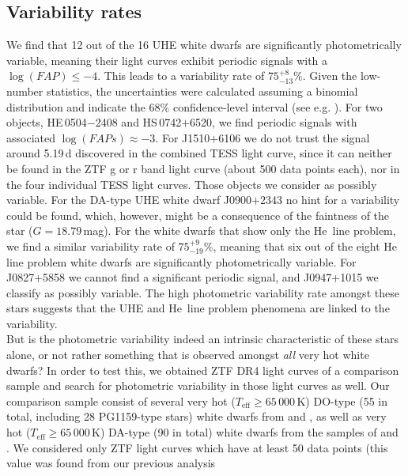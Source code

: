 \documentclass{aa}
\newcounter{Rco}
\newcommand{\Ionst}[1]{\setcounter{Rco}{#1}\Roman{Rco}}
\newcommand{\Ion}[2]{\mbox{#1\,{\scriptsize\Ionst{#2}}}}
\newcommand{\Teff}{\mbox{$T_\mathrm{eff}$}\xspace}
\begin{document}
\subsection{Variability rates}
\label{sect:var}
We find that 12 out of the 16 UHE white dwarfs are significantly
photometrically variable, meaning their light curves exhibit periodic signals
with a $\log(FAP)\leq-4$. This leads to a variability rate of $75^{+8}_{-13}$\%.
Given the low-number statistics, the uncertainties were calculated assuming
a binomial distribution and indicate the 68\% confidence-level interval
(see e.g. \citealt{Burgasser+2003}). For two objects, HE\,0504$-$2408 and
HS\,0742$+$6520, we find periodic signals with associated
$\log(FAPs)\approx -3$. For J1510$+$6106 we do not trust the signal
around 5.19\,d discovered in the combined TESS light curve, since
it can neither be found in the ZTF g or r band light curve (about 500 data
points each), nor in the four individual TESS light curves.
Those objects we consider as possibly variable.
For the DA-type UHE white dwarf J0900$+$2343 no hint for a variability
could be found, which, however, might be a consequence of the faintness of the star
($G=18.79$\,mag).
For the white dwarfs that show only the \Ion{He}{2} line problem, we find
a similar variability rate of $75^{+9}_{-19}$\%, meaning that six out of the eight
\Ion{He}{2} line problem white dwarfs are significantly photometrically
variable. For J0827+5858 we cannot find a significant periodic signal, and
J0947+1015 we classify as possibly variable. The high photometric
variability rate amongst these stars suggests that the UHE and \Ion{He}{2}
line problem phenomena are linked to the variability.\\
But is the photometric variability indeed an
intrinsic characteristic of these stars alone, or not
rather something that is observed amongst \textit{all} very hot white dwarfs?
In order to test this, we obtained ZTF DR4 light curves of a
comparison sample and search for photometric variability in those light
curves as well. Our comparison sample consist of several very hot (\Teff$\geq 65\,000$\,K)
DO-type (55 in total, including 28 PG1159-type stars) white dwarfs from
\cite{Dreizlerwerner1996, DreizlerHeber1998, Huegelmeyer+2005, Huegelmeyer+2006,
  WernerHerwig2006, Reindl+2014c, Werner+2014} and \cite{Reindl+2018a}, as well as
very hot (\Teff$\geq 65\,000$\,K) DA-type (90 in total) white dwarfs from the
samples of \cite{Gianninas+2011} and \cite{Tremblay+2019}. We considered only
ZTF light curves which have at
least 50 data points (this value was found from our previous analysis
\end{document}
